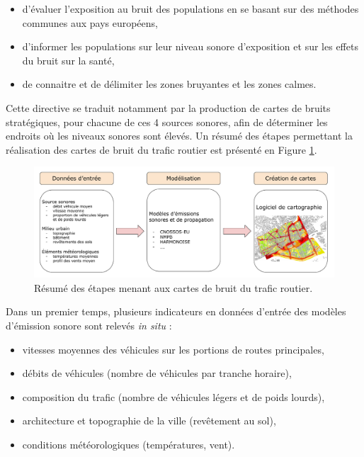 \begin{itemize}
	\item d'évaluer l'exposition au bruit des populations en se basant sur des méthodes communes aux pays européens,
	\item d'informer les populations sur leur niveau sonore d'exposition et sur les effets du bruit sur la santé,
	\item de connaitre et de délimiter les zones bruyantes et les zones calmes.\\
\end{itemize}

Cette directive se traduit notamment par la production de cartes de bruits stratégiques, pour chacune de ces 4 sources sonores, afin de déterminer les endroits où les niveaux sonores sont élevés. Un résumé des étapes permettant la réalisation des cartes de bruit du trafic routier est présenté en Figure \ref{fig:cartographie}.\\


\begin{figure}[h]
\centering
\includegraphics[width=.85\linewidth]{./figures/cartographie/cartographie.pdf}
\caption{Résumé des étapes menant aux cartes de bruit du trafic routier.}
\label{fig:cartographie}
\end{figure}

Dans un premier temps, plusieurs indicateurs en données d'entrée des modèles d'émission sonore sont relevés \textit{in situ} :

\begin{itemize}
\item vitesses moyennes des véhicules sur les portions de routes principales,
\item débits de véhicules (nombre de véhicules par tranche horaire),
\item composition du trafic (nombre de véhicules légers et de poids lourds),
\item architecture et topographie de la ville (revêtement au sol),
\item conditions météorologiques (températures, vent).\\
\end{itemize}


